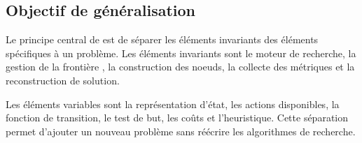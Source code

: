 \subsection{Objectif de généralisation}

Le principe central de \AUSSI{} est de séparer les éléments invariants des
éléments spécifiques à un problème. Les éléments invariants sont le moteur de
recherche, la gestion de la frontière , la construction des noeuds,
la collecte des métriques et la reconstruction de solution.

Les éléments variables sont la représentation d'état, les actions disponibles,
la fonction de transition, le test de but, les coûts et l'heuristique. Cette
séparation permet d'ajouter un nouveau problème sans réécrire les algorithmes
de recherche.